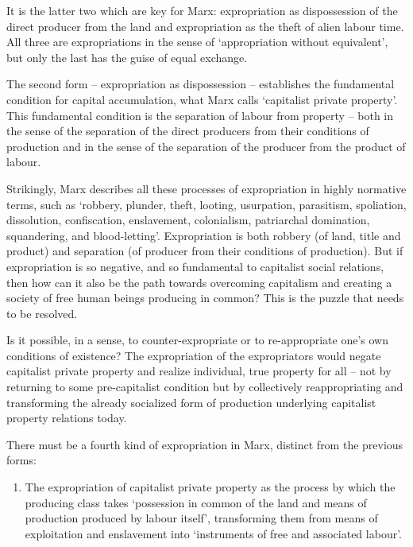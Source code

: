 \documentclass[
]{book}
\providecommand{\tightlist}{%
  \setlength{\itemsep}{0pt}\setlength{\parskip}{0pt}}
\begin{document}
It is the latter two which are key for Marx:
expropriation as dispossession of the direct producer from the land and
expropriation as the theft of alien labour time.
All three are expropriations in the sense of
`appropriation without equivalent', but only the last has the guise of equal exchange.

The second form -- expropriation as dispossession -- establishes the fundamental
condition for capital accumulation, what Marx calls `capitalist private property'.
This fundamental condition is the separation of labour from property --
both in the sense of the separation of
the direct producers from their conditions of production and in the sense of
the separation of the producer from the product of labour.

Strikingly, Marx describes all these processes of expropriation in highly normative
terms, such as `robbery, plunder, theft, looting, usurpation, parasitism, spoliation,
dissolution, conﬁscation, enslavement, colonialism, patriarchal domination, squandering,
and blood-letting'.
Expropriation is both robbery (of land, title and product) and
separation (of producer from their conditions of production).
But if expropriation is so negative, and so fundamental to capitalist social relations,
then how can it also be the path towards overcoming capitalism and creating a society
of free human beings producing in common? This is the puzzle that needs to be resolved.

Is it possible, in a sense, to counter-expropriate or to re-appropriate one's own
conditions of existence?
The expropriation of the expropriators would negate capitalist private property and
realize individual, true property for all -- not by returning to some pre-capitalist
condition but by
collectively reappropriating and transforming the already socialized form of production
underlying capitalist property relations today.

There must be a fourth kind of expropriation in Marx, distinct from the
previous forms:

\begin{enumerate}
\def\labelenumi{\arabic{enumi}.}
\setcounter{enumi}{3}
\tightlist
\item
  The expropriation of capitalist private property as the process by which the
  producing class takes `possession in common of the land and means of production
  produced by labour itself', transforming them from means of exploitation and
  enslavement into `instruments of free and associated labour'.
\end{enumerate}
\end{document}
